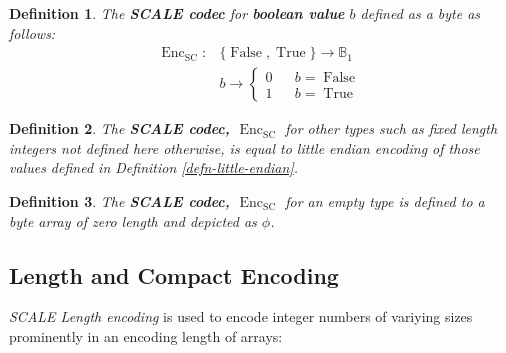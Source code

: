 \documentclass{book}
\newcommand{\tmem}[1]{{\em #1\/}}
\newcommand{\tmop}[1]{\ensuremath{\operatorname{#1}}}
\newcommand{\tmstrong}[1]{\textbf{#1}}
\newcommand{\tmtextbf}[1]{{\bfseries{#1}}}
\newcommand{\tmtextit}[1]{{\itshape{#1}}}
\newtheorem{definition}{Definition}
\providecommand{\tmem}[1]{\tmtextit{#1}}
\providecommand{\tmop}[1]{\ensuremath{\mathrm{#1}}}
\providecommand{\tmstrong}[1]{\tmtextbf{#1}}
\providecommand{\tmtextbf}[1]{\tmtextbf{#1}}
\providecommand{\tmtextit}[1]{\tmtextit{#1}}
\newtheorem{definition}{Definition}
\begin{document}
\begin{definition}
  The {\tmstrong{SCALE codec}} for {\tmstrong{boolean value}} $b$ defined as a
  byte as follows:
  \[ \begin{array}{ll}
       \tmop{Enc}_{\tmop{SC}} : & \{ \tmop{False}, \tmop{True} \} \rightarrow
       \mathbb{B}_1\\
       & b \rightarrow \left\{ \begin{array}{lcl}
         0 &  & b = \tmop{False}\\
         1 &  & b = \tmop{True}
       \end{array} \right.
     \end{array} \]
\end{definition}

\begin{definition}
  \label{defn-scale-fixed-length}The {\tmstrong{SCALE codec,
  $\tmop{Enc}_{\tmop{SC}}$}} for other types such as fixed length integers not
  defined here otherwise, is equal to little endian encoding of those values
  defined in Definition \ref{defn-little-endian}. 
\end{definition}

\begin{definition}
  \label{defn-scale-empty}The {\tmstrong{SCALE codec,
  $\tmop{Enc}_{\tmop{SC}}$}} for an empty type is defined to a byte array of
  zero length and depicted as {\tmstrong{$\phi$}}.
\end{definition}

\subsection{Length and Compact Encoding}\label{sect-int-encoding}

{\tmem{SCALE Length encoding}} is used to encode integer numbers of variying
sizes prominently in an encoding length of arrays:
\end{document}
